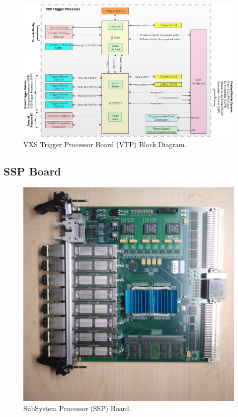 \begin{figure}[hbt]
	\centering
	\includegraphics[width=1.0\columnwidth,keepaspectratio]{img/vtp_block_daq.png}
	\caption{VXS Trigger Processor Board (VTP) Block Diagram.}
	\label{fig:vtp_block_daq}
\end{figure}


\subsection{SSP Board}
\label{sec:ssp_board}

\begin{figure}[hbt]
	\centering
	\includegraphics[width=1.0\columnwidth,keepaspectratio]{img/ssp_board.png}
	\caption{SubSystem Processor (SSP) Board.}
	\label{fig:ssp_board}
\end{figure}

